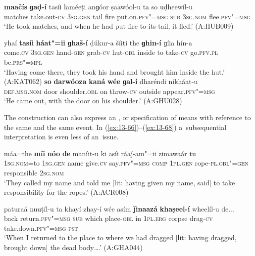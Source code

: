 \ex
\label{ex:13-63}
\gll \textbf{maačís} \textbf{ɡaḍ-í} tasíi laméeṭi anɡóor ṣaawóol-u ta so uḍheewíl-u \\
matches take.out-\textsc{cv} \textsc{3sg.gen} tail fire put.on.\textsc{pfv"=msg}  \textsc{sub } \textsc{3sg.nom} flee.\textsc{pfv"=msg} \\
\glt `He took matches, and when he had put fire to its tail, it fled.' (A:HUB009)

\ex
\label{ex:13-64}
\gll yhaí \textbf{tasíi} \textbf{háat"=ii} \textbf{ɡhaš-í} ḍúkur-a šíiṭi the \textbf{ɡhin-í} ɡíia hín-a  \\
come.\textsc{cv} \textsc{3sg.gen} hand-\textsc{gen} grab-\textsc{cv} hut-\textsc{obl} inside to  take-\textsc{cv} go.\textsc{pfv.pl} be.\textsc{prs"=mpl} \\
\glt `Having come there, they took his hand and brought him inside the hut.' (A:KAT062)
\ex
\label{ex:13-65}
\gll \textbf{so} \textbf{darwóoza} \textbf{kaná} \textbf{wée} \textbf{ɡal-í} dharéndi nikháat-u\\
\textsc{def.msg.nom} door shoulder.\textsc{obl} on throw-\textsc{cv} outside appear.\textsc{pfv"=msg}\\
\glt `He came out, with the door on his shoulder.' (A:GHU028) 
\z

 The  construction can also express an , or specification of means with reference to the same  and the same event. In (\ref{ex:13-66})--(\ref{ex:13-68}) a~subsequential interpretation is even less of an~issue.

\ea
\label{ex:13-66}
\gll máa=the \textbf{míi} \textbf{nóo} \textbf{de} maníit-u ki asíi ráaǰ-am"=ii zimawaár tu  \\
\textsc{1sg.nom}=to \textsc{1sg.gen} name give.\textsc{cv} say.\textsc{pfv"=msg} \textsc{comp}  \textsc{1pl.gen} rope-\textsc{pl.obl"=gen} responsible \textsc{2sg.nom}  \\
\glt `They called my name and told me [lit: having given my name, said] to take responsibility for the ropes.' (A:ACR008)

\ex
\label{ex:13-67}
\gll paturaá nuuṭíl-u ta khayí zhay-í wée asím \textbf{ǰinaazá} \textbf{khaṣeel-í} wheelíl-u de...\\
back return.\textsc{pfv"=msg} \textsc{sub} which place-\textsc{obl} in \textsc{1pl.erg}  corpse drag-\textsc{cv} take.down.\textsc{pfv"=msg} \textsc{pst}\\
\glt `When I returned to the place to where we had dragged [lit: having dragged, brought down] the dead body{\ldots}.' (A:GHA044)

